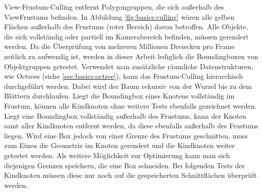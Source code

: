 View-Frustum-Culling entfernt Polygongruppen, die sich außerhalb des ViewFrustums befinden. In Abbildung \ref{fig:basics:culling} wären alle gelben Flächen außerhalb des Frustums (roter Bereich) davon betroffen. Alle Objekte, die sich vollständig oder partiell im Kamerabereich befinden, müssen gerendert werden. Da die Überprüfung von mehreren Millionen Dreiecken pro Frame zeitlich zu aufwendig ist, werden in dieser Arbeit lediglich die Boundingboxen von Objektgruppen getestet. Verwendet man zusätzliche räumliche Datenstrukturen, wie Octrees (siehe \ref{sec:basics:octree}), kann das Frustum-Culling hierarchisch durchgeführt werden. Dabei wird der Baum rekursiv von der Wurzel bis zu dem Blättern durchlaufen. Liegt die Boundingbox eines Knotens vollständig im Frustum, können alle Kindknoten ohne weitere Tests ebenfalls gezeichnet werden. Liegt eine Boundingbox vollständig außerhalb des Frustums, kann der Knoten samt aller Kindknoten entfernt werden, da diese ebenfalls außerhalb des Frustums liegen. Wird eine Box jedoch von einer Grenze des Frustums geschnitten, muss zum Einen die Geometrie im Knoten gerendert und die Kindknoten weiter getestet werden. Als weitere Möglichkeit zur Optimierung kann man sich diejenigen Grenzen speichern, die eine Box schneiden. Bei folgenden Tests der Kindknoten müssen diese nur noch auf die gespeicherten Schnittflächen überprüft werden.\\
